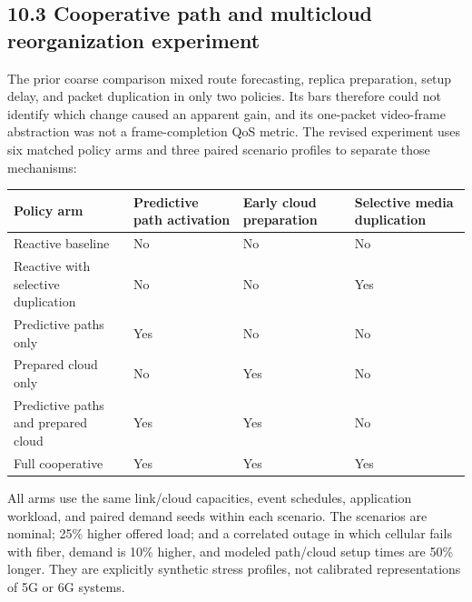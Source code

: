 \documentclass[
  american,
  11pt,
]{article}
\newcounter{none} %
\begin{document}
\subsection{10.3 Cooperative path and multicloud reorganization
experiment}\label{cooperative-path-and-multicloud-reorganization-experiment}

The prior coarse comparison mixed route forecasting, replica
preparation, setup delay, and packet duplication in only two policies.
Its bars therefore could not identify which change caused an apparent
gain, and its one-packet video-frame abstraction was not a
frame-completion QoS metric. The revised experiment uses six matched
policy arms and three paired scenario profiles to separate those
mechanisms:

{\def\LTcaptype{none} %
\begin{longtable}[]{@{}
  >{\raggedright\arraybackslash}p{}
  >{\raggedleft\arraybackslash}p{}
  >{\raggedleft\arraybackslash}p{}
  >{\raggedleft\arraybackslash}p{}@{}}
\toprule\noalign{}
\begin{minipage}[b]{\linewidth}\raggedright
Policy arm
\end{minipage} & \begin{minipage}[b]{\linewidth}\raggedleft
Predictive path activation
\end{minipage} & \begin{minipage}[b]{\linewidth}\raggedleft
Early cloud preparation
\end{minipage} & \begin{minipage}[b]{\linewidth}\raggedleft
Selective media duplication
\end{minipage} \\
\midrule\noalign{}
\endhead
\bottomrule\noalign{}
\endlastfoot
Reactive baseline & No & No & No \\
Reactive with selective duplication & No & No & Yes \\
Predictive paths only & Yes & No & No \\
Prepared cloud only & No & Yes & No \\
Predictive paths and prepared cloud & Yes & Yes & No \\
Full cooperative & Yes & Yes & Yes \\
\end{longtable}
}

All arms use the same link/cloud capacities, event schedules,
application workload, and paired demand seeds within each scenario. The
scenarios are nominal; 25\% higher offered load; and a correlated outage
in which cellular fails with fiber, demand is 10\% higher, and modeled
path/cloud setup times are 50\% longer. They are explicitly synthetic
stress profiles, not calibrated representations of 5G or 6G systems.
\end{document}
